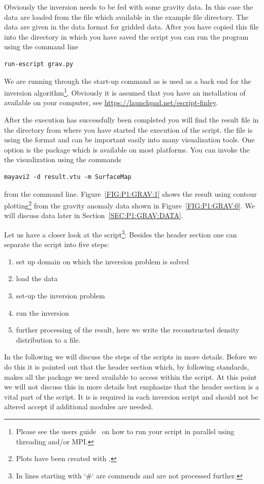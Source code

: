 Obviously the inversion needs to be fed with some gravity data. In this case 
the data are loaded from the file  which available in the \escript example file directory. The data are given 
in the \netcdf data format for gridded data. After you have copied this file into the directory in which you have
saved the script  you can run the program using the command line 
\begin{verbatim}
run-escript grav.py
\end{verbatim}
We are running  through the \escript start-up command as \escript is used as a back end for the inversion 
algorithm\footnote{Please see the \escript users guide~\cite{ESCRIPT} on how to run 
your script in parallel using threading and/or MPI.}. Obviously it is  assumed that you have an
installation of \escript available on your computer, see \url{https://launchpad.net/escript-finley}.

After the execution has successfully been completed you will find the result file  in the directory
from where you have started the execution of the script. the file is using the \VTK format and can be important 
easily into many visualization tools. One option is the \mayavi package which is available on most platforms. You can invoke the
the visualization using the commands
\begin{verbatim}
mayavi2 -d result.vtu -m SurfaceMap
\end{verbatim}
from the command line. Figure~\ref{FIG:P1:GRAV:1} shows the result using contour plotting\footnote{Plots
have been created with \VisIt.} from the gravity anomaly data shown in Figure~\ref{FIG:P1:GRAV:0}. We will 
discuss data later in Section~\ref{SEC:P1:GRAV:DATA}.

Let us have a closer look at the script\footnote{In \python lines starting with `\#` are commends and are not processed further.}: Besides the header section one can separate the script into five steps:
\begin{enumerate}
 \item set up domain on which the inversion problem is solved
 \item load the data 
\item set-up the inversion problem
\item run the inversion
\item further processing of the result, here we write the reconstructed density distribution to a file.
\end{enumerate}
In the following we will discuss the steps of the scripts in more details. Before we do this it is pointed out that
the header section which, by following \python standards, makes all the package we need available to access within the script. At this
point we will not discuss this in more details but emphasize that the header section is a vital part of the script. It is is required 
in each \downunder inversion script and should not be altered accept if additional modules are needed. 

